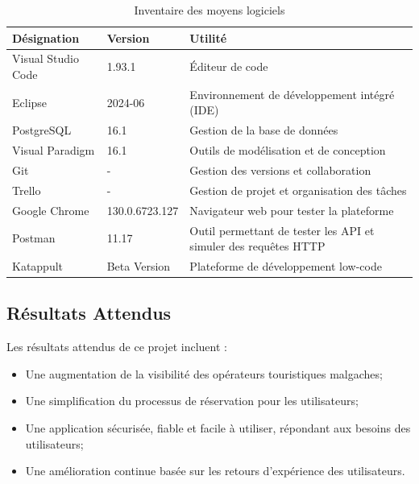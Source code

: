 \documentclass[12pt]{report}
\begin{document}
				\begin{table}[h]
				  \centering
				  \caption{Inventaire des moyens logiciels}
				  \label{tab:moyensLogiciels}
				    \begin{tabular}{|p{4cm}|p{3cm}|p{7cm}|}
					      \hline
					      \textbf{Désignation} & \textbf{Version} & \textbf{Utilité}\\
					      \hline
					      Visual Studio Code & 1.93.1 & Éditeur de code\\
					     \hline
					     Eclipse & 2024-06 & Environnement de développement intégré (IDE)\\
						\hline
 						PostgreSQL & 16.1 & Gestion de la base de données\\
						\hline
						Visual Paradigm & 16.1 & Outils de modélisation et de conception\\
						\hline
						Git & - & Gestion des versions et collaboration\\
						\hline
						Trello & - & Gestion de projet et organisation des tâches\\
						\hline
						Google Chrome & 130.0.6723.127 & Navigateur web pour tester la plateforme\\
						\hline
						Postman & 11.17 & Outil permettant de tester les API et simuler des requêtes HTTP\\
						\hline
						Katappult & Beta Version & Plateforme de développement low-code\\
						\hline 
				    \end{tabular}
				\end{table}
				\FloatBarrier


				\subsection{Résultats Attendus}

				\hspace{15pt} Les résultats attendus de ce projet incluent :
				
				\begin{itemize}
					\item Une augmentation de la visibilité des opérateurs touristiques malgaches;
					\item Une simplification du processus de réservation pour les utilisateurs;
					\item Une application sécurisée, fiable et facile à utiliser, répondant aux besoins des utilisateurs;
					\item Une amélioration continue basée sur les retours d'expérience des utilisateurs.
				\end{itemize}
\end{document}

